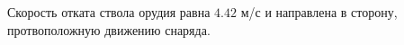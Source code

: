 Скорость отката ствола орудия равна $4.42$ м/с и направлена в сторону,
протвоположную движению снаряда.
